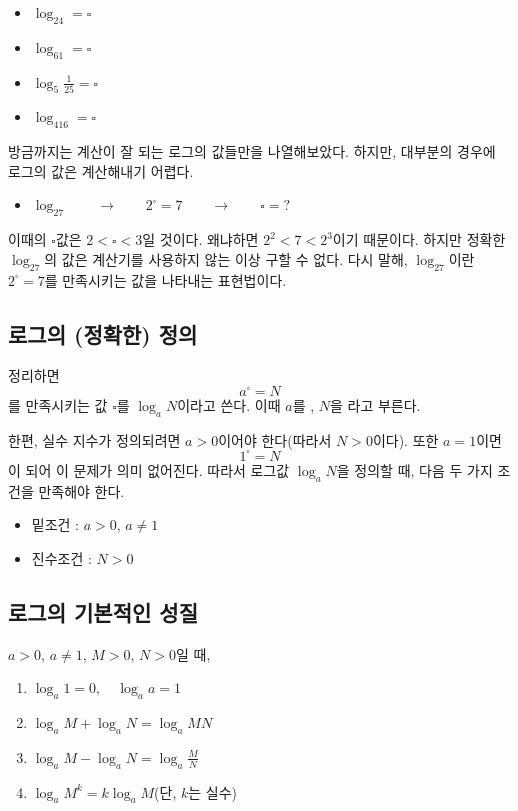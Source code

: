 \documentclass[a4paper,twocolumn]{article}
\begin{document}
\bigskip
\begin{itemize}
\item
\(\log_24=\square\)
\item
\(\log_61=\square\)
\item
\(\log_5\frac1{25}=\square\)
\item
\(\log_416=\square\)
\end{itemize}

방금까지는 계산이 잘 되는 로그의 값들만을 나열해보았다.
하지만, 대부분의 경우에 로그의 값은 계산해내기 어렵다.
\begin{itemize}
\item
\(\log_27\qquad\longrightarrow\qquad2^\square=7\qquad\longrightarrow\qquad\square=?\)
\end{itemize}
이때의 \(\square\)값은 \(2<\square<3\)일 것이다.
왜냐하면 \(2^2<7<2^3\)이기 때문이다.
하지만 정확한 \(\log_27\)의 값은 계산기를 사용하지 않는 이상 구할 수 없다.
다시 말해, \(\log_27\)이란 \(2^\square=7\)를 만족시키는 값을 나타내는 표현법이다.

%
\subsection{로그의 (정확한) 정의}
정리하면
\[a^\square=N\]
를 만족시키는 값 \(\square\)를 \(\log_aN\)이라고 쓴다.
이때 \(a\)를 , \(N\)을 라고 부른다.

한편, 실수 지수가 정의되려면 \(a>0\)이어야 한다(따라서 \(N>0\)이다).
또한 \(a=1\)이면
\[1^\square=N\]
이 되어 이 문제가 의미 없어진다.
따라서 로그값 \(\log_aN\)을 정의할 때, 다음 두 가지 조건을 만족해야 한다.
\begin{itemize}
\item
밑조건 : \(a>0\), \(a\neq1\)
\item
진수조건 : \(N>0\)
\end{itemize}

%
\subsection{로그의 기본적인 성질}
\(a>0\), \(a\neq1\), \(M>0\), \(N>0\)일 때,
\begin{enumerate}[(1)]
\item
\(\log_a1=0,\quad\log_aa=1\)
\item
\(\log_aM+\log_aN=\log_aMN\)
\item
\(\log_aM-\log_aN=\log_a{\frac MN}\)
\item
\(\log_a{M^k}=k\log_aM\)\quad(단, \(k\)는 실수)
\end{enumerate}
\end{document}
